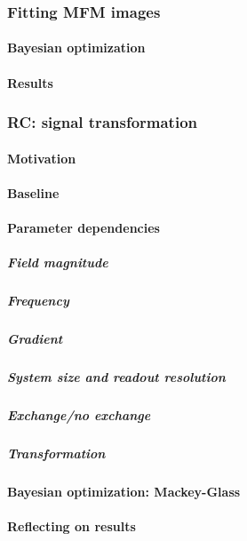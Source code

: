 \subsubsection{Fitting MFM images}
\paragraph{Bayesian optimization}
\paragraph{Results} %
\subsubsection{RC: signal transformation}
\paragraph{Motivation} %
\paragraph{Baseline}
\paragraph{Parameter dependencies}
\subparagraph{Field magnitude}
\subparagraph{Frequency}
\subparagraph{Gradient}
\subparagraph{System size and readout resolution}
\subparagraph{Exchange/no exchange}
\subparagraph{Transformation}
\paragraph{Bayesian optimization: Mackey-Glass}
\paragraph{Reflecting on results} %
